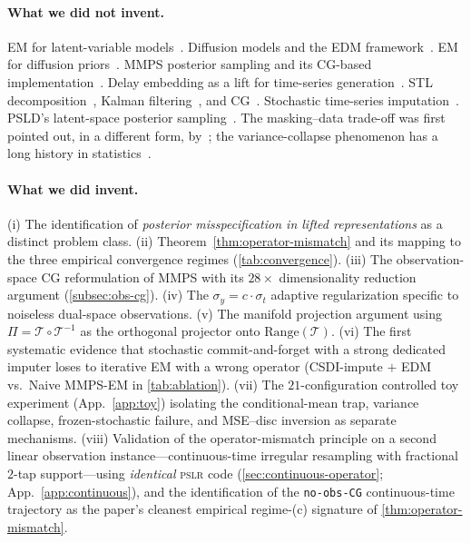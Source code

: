 \documentclass{article}
\theoremstyle{plain}
\theoremstyle{definition}
\theoremstyle{remark}
\newcommand{\tsimg}{\mathcal{T}}
\newcommand{\imgts}{\mathcal{T}^{-1}}
\newcommand{\pslr}{\textsc{pslr}}
\begin{document}
\paragraph{What we did not invent.}
EM for latent-variable models~\citep{dempster1977em}. Diffusion models and the EDM framework~\citep{karras2022edm,ho2020ddpm,song2021sde}. EM for diffusion priors~\citep{rozet2024diem}. MMPS posterior sampling and its CG-based implementation~\citep{rozet2024diem}. Delay embedding as a lift for time-series generation~\citep{takens1981embedding,naiman2024imagentime}. STL decomposition~\citep{cleveland1990stl}, Kalman filtering~\citep{kalman1960new}, and CG~\citep{hestenes1952cg}. Stochastic time-series imputation~\citep{tashiro2021csdi}. PSLD's latent-space posterior sampling~\citep{rout2024psld}. The masking--data trade-off was first pointed out, in a different form, by~\citep{fadlon2025imageni2r}; the variance-collapse phenomenon has a long history in statistics~\citep{rubin1987multiple}.

\paragraph{What we did invent.}
(i) The identification of \emph{posterior misspecification in lifted representations} as a distinct problem class. (ii) Theorem~\ref{thm:operator-mismatch} and its mapping to the three empirical convergence regimes (\cref{tab:convergence}). (iii) The observation-space CG reformulation of MMPS with its $28\times$ dimensionality reduction argument (\cref{subsec:obs-cg}). (iv) The $\sigma_y = c \cdot \sigma_t$ adaptive regularization specific to noiseless dual-space observations. (v) The manifold projection argument using $\Pi = \tsimg \circ \imgts$ as the orthogonal projector onto $\mathrm{Range}(\tsimg)$. (vi) The first systematic evidence that stochastic commit-and-forget with a strong dedicated imputer loses to iterative EM with a wrong operator (CSDI-impute $+$ EDM vs.\ Naive MMPS-EM in \cref{tab:ablation}). (vii) The $21$-configuration controlled toy experiment (App.~\ref{app:toy}) isolating the conditional-mean trap, variance collapse, frozen-stochastic failure, and MSE--disc inversion as separate mechanisms. (viii) Validation of the operator-mismatch principle on a second linear observation instance---continuous-time irregular resampling with fractional $2$-tap support---using \emph{identical} \pslr{} code (\cref{sec:continuous-operator}; App.~\ref{app:continuous}), and the identification of the \texttt{no-obs-CG} continuous-time trajectory as the paper's cleanest empirical regime-(c) signature of \cref{thm:operator-mismatch}.
\end{document}
